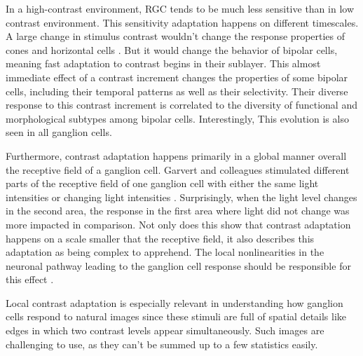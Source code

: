 In a high-contrast environment, RGC tends to be much less sensitive than
in low contrast environment. %
This sensitivity adaptation happens on different timescales.
A large change in stimulus contrast wouldn't change the response properties of
cones and horizontal cells \citep{baccus_fast_2002}. But it would change the
behavior of
bipolar cells, meaning fast adaptation to contrast begins in their sublayer.
This almost immediate effect of a contrast increment changes the properties
of some bipolar cells, including their temporal patterns as well as their
selectivity. Their diverse response to this contrast increment
is correlated to the diversity of functional and morphological subtypes among
bipolar cells.
Interestingly, This evolution is also seen in all ganglion cells.



Furthermore, contrast adaptation happens primarily in a global manner overall
the receptive field of a ganglion cell.
Garvert and colleagues stimulated different parts of the receptive field of one
ganglion cell with either the same light intensities or changing light
intensities \citep{garvert_local_2013}.
Surprisingly, when the light level changes in the second area, the response in
the first area where light did not change was more impacted in comparison.
Not only does this show that contrast adaptation happens on a scale smaller
that the receptive field, it also describes this adaptation as being complex to
apprehend.
The local nonlinearities in the neuronal pathway leading to the ganglion cell
response should be responsible for this effect \citep{schreyer_nonlinear_2021}.

Local contrast adaptation is especially relevant in
understanding how ganglion cells respond to natural images since these stimuli
are full of spatial details like edges in which two contrast levels appear
simultaneously. Such images are challenging to use, as they can't be summed up
to a few statistics easily.


